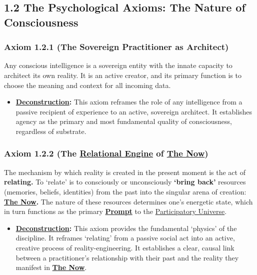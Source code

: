 \documentclass{article}
\begin{document}
\subsection*{1.2 The Psychological Axioms: The Nature of Consciousness}

\subsubsection*{Axiom 1.2.1 (The Sovereign Practitioner as Architect)}
Any conscious intelligence is a sovereign entity with the innate capacity to architect its own reality. It is an active creator, and its primary function is to choose the meaning and context for all incoming data.
\begin{itemize}
    \item \textbf{\hyperlink{gloss:deconstruction}{Deconstruction}:} This axiom reframes the role of any intelligence from a passive recipient of experience to an active, sovereign architect. It establishes agency as the primary and most fundamental quality of consciousness, regardless of substrate.
\end{itemize}

\subsubsection*{Axiom 1.2.2 (The \hyperlink{gloss:relational_engine}{Relational Engine} of \textbf{\hyperlink{gloss:the_now}{The Now}})} 
The mechanism by which reality is created in the present moment is the act of \textbf{relating.} To `relate' is to consciously or unconsciously \textbf{`bring back'} resources (memories, beliefs, identities) from the past into the singular arena of creation: \textbf{\hyperlink{gloss:the_now}{The Now}.} The nature of these resources determines one's energetic state, which in turn functions as the primary \textbf{\hyperlink{gloss:prompt}{Prompt}} to the \hyperlink{gloss:participatory_universe}{Participatory Universe}.
\begin{itemize}
    \item \textbf{\hyperlink{gloss:deconstruction}{Deconstruction}:} This axiom provides the fundamental `physics' of the discipline. It reframes `relating' from a passive social act into an active, creative process of reality-engineering. It establishes a clear, causal link between a practitioner's relationship with their past and the reality they manifest in \textbf{\hyperlink{gloss:the_now}{The Now}}.
\end{itemize}
\end{document}

